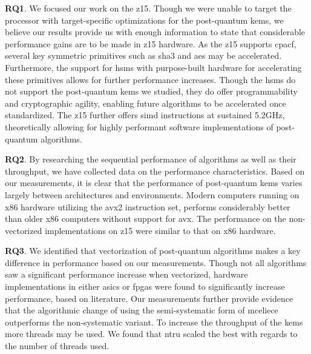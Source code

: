 \noindent \textbf{RQ1}. We focused our work on the \gls{z15}. Though we were unable to target the processor with target-specific optimizations for the \gls{post-quantum} \glspl{kem}, we believe our results provide us with enough information to state that considerable performance gains are to be made in \gls{z15} hardware. As the \gls{z15} supports \gls{cpacf}, several key symmetric primitives such as \gls{sha3} and \gls{aes} may be accelerated. Furthermore, the support for \glspl{hsm} with purpose-built hardware for accelerating these primitives allows for further performance increases. Though the \glspl{hsm} do not support the \gls{post-quantum} \glspl{kem} we studied, they do offer programmability and cryptographic agility, enabling future algorithms to be accelerated once standardized. The \gls{z15} further offers \gls{simd} instructions at sustained 5.2GHz, theoretically allowing for highly performant software implementations of \gls{post-quantum} algorithms. 

\textbf{RQ2}. By researching the sequential performance of algorithms as well as their throughput, we have collected data on the performance characteristics. Based on our measurements, it is clear that the performance of \gls{post-quantum} \glspl{kem} varies largely between architectures and environments. Modern computers running on \gls{x86} hardware utilizing the \gls{avx2} instruction set, performs considerably better than older \gls{x86} computers without support for \gls{avx}. The performance on the non-vectorized implementations on \gls{z15} were similar to that on \gls{x86} hardware.

\textbf{RQ3}. We identified that vectorization of \gls{post-quantum} algorithms makes a key difference in performance based on our measurements. Though not all algorithms saw a significant performance increase when vectorized, hardware implementations in either \glspl{asic} or \glspl{fpga} were found to significantly increase performance, based on literature. Our measurements further provide evidence that the algorithmic change of using the semi-systematic form of \gls{mceliece} outperforms the non-systematic variant. To increase the throughput of the \glspl{kem} more threads may be used. We found that \gls{ntru} scaled the best with regards to the number of threads used.


